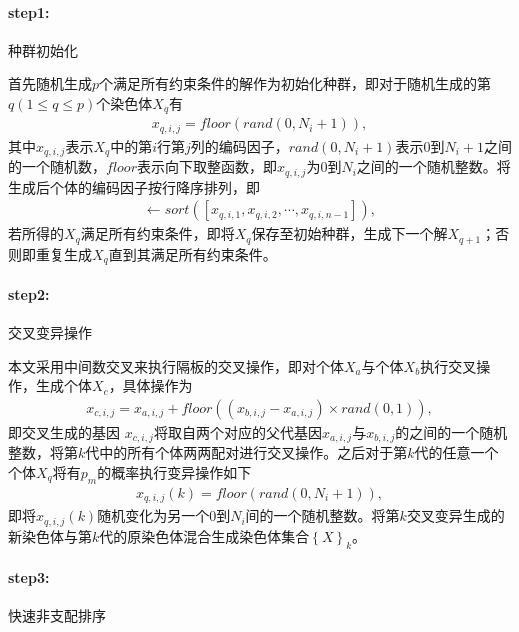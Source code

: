 \documentclass{whutmod}
\begin{document}
		\paragraph{step1:}种群初始化
		

		首先随机生成$p$个满足所有约束条件的解作为初始化种群，即对于随机生成的第$q(1\leqslant q\leqslant p)$个染色体$X_q$有
		\begin{gather*}
	    x_{q,i,j}=floor(rand(0,N_i+1)),
		\end{gather*}
		其中$x_{q,i,j}$表示$X_q$中的第$i$行第$j$列的编码因子，$rand(0,N_i+1)$表示$0$到$N_i+1$之间的一个随机数，$floor$表示向下取整函数，即$x_{q,i,j}$为$0$到$N_i$之间的一个随机整数。将生成后个体的编码因子按行降序排列，即
		\begin{gather*}
		[x_{q,i,1},x_{q,i,2},\cdots,x_{q,i,n-1}]\leftarrow sort([x_{q,i,1},x_{q,i,2},\cdots,x_{q,i,n-1}]),
		\end{gather*}
		若所得的$X_q$满足所有约束条件，即将$X_q$保存至初始种群，生成下一个解$X_{q+1}$；否则即重复生成$X_{q}$直到其满足所有约束条件。

		
		\paragraph{step2:}交叉变异操作
		
		本文采用中间数交叉来执行隔板的交叉操作，即对个体$X_a$与个体$X_b$执行交叉操作，生成个体$X_c$，具体操作为
		\begin{gather*}
		x_{c,i,j}=x_{a,i,j}+floor((x_{b,i,j}-x_{a,i,j})\times rand(0,1)),
		\end{gather*}
		即交叉生成的基因 $x_{c,i,j}$将取自两个对应的父代基因$x_{a,i,j}$与$x_{b,i,j}$的之间的一个随机整数，将第$k$代中的所有个体两两配对进行交叉操作。之后对于第$k$代的任意一个个体$X_q$将有$p_m$的概率执行变异操作如下
		\begin{gather*}
		x_{q,i,j}(k)=floor(rand(0,N_i+1)),
		\end{gather*}
		即将$x_{q,i,j}(k)$随机变化为另一个$0$到$N_i$间的一个随机整数。将第$k$交叉变异生成的新染色体与第$k$代的原染色体混合生成染色体集合$\left \{ X \right \}_k$。
		\paragraph{step3:}快速非支配排序
		
\end{document}
